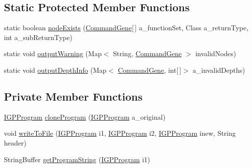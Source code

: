 \subsection*{Static Protected Member Functions}
\begin{DoxyCompactItemize}
\item 
static boolean \hyperlink{classorg_1_1jgap_1_1gp_1_1impl_1_1_g_p_genotype_ae3828fb2c7d3c3cc4ee2c1562c9851d8}{node\-Exists} (\hyperlink{classorg_1_1jgap_1_1gp_1_1_command_gene}{Command\-Gene}\mbox{[}$\,$\mbox{]} a\-\_\-function\-Set, Class a\-\_\-return\-Type, int a\-\_\-sub\-Return\-Type)
\item 
static void \hyperlink{classorg_1_1jgap_1_1gp_1_1impl_1_1_g_p_genotype_ae5eb2b5f82dd89d6e8287eac90864cb1}{output\-Warning} (Map$<$ String, \hyperlink{classorg_1_1jgap_1_1gp_1_1_command_gene}{Command\-Gene} $>$ invalid\-Nodes)
\item 
static void \hyperlink{classorg_1_1jgap_1_1gp_1_1impl_1_1_g_p_genotype_a95fd91fcd94500415c67e18388695a61}{output\-Depth\-Info} (Map$<$ \hyperlink{classorg_1_1jgap_1_1gp_1_1_command_gene}{Command\-Gene}, int\mbox{[}$\,$\mbox{]}$>$ a\-\_\-invalid\-Depths)
\end{DoxyCompactItemize}
\subsection*{Private Member Functions}
\begin{DoxyCompactItemize}
\item 
\hyperlink{interfaceorg_1_1jgap_1_1gp_1_1_i_g_p_program}{I\-G\-P\-Program} \hyperlink{classorg_1_1jgap_1_1gp_1_1impl_1_1_g_p_genotype_aa21cc2dde0ca8cbc6048b37e62dd1593}{clone\-Program} (\hyperlink{interfaceorg_1_1jgap_1_1gp_1_1_i_g_p_program}{I\-G\-P\-Program} a\-\_\-original)
\item 
void \hyperlink{classorg_1_1jgap_1_1gp_1_1impl_1_1_g_p_genotype_ac726d5312c002c60c239a9be1bc7cfba}{write\-To\-File} (\hyperlink{interfaceorg_1_1jgap_1_1gp_1_1_i_g_p_program}{I\-G\-P\-Program} i1, \hyperlink{interfaceorg_1_1jgap_1_1gp_1_1_i_g_p_program}{I\-G\-P\-Program} i2, \hyperlink{interfaceorg_1_1jgap_1_1gp_1_1_i_g_p_program}{I\-G\-P\-Program} inew, String header)
\item 
String\-Buffer \hyperlink{classorg_1_1jgap_1_1gp_1_1impl_1_1_g_p_genotype_a356baf22df15fe6c0c88aadb45a80a5e}{get\-Program\-String} (\hyperlink{interfaceorg_1_1jgap_1_1gp_1_1_i_g_p_program}{I\-G\-P\-Program} i1)
\end{DoxyCompactItemize}
